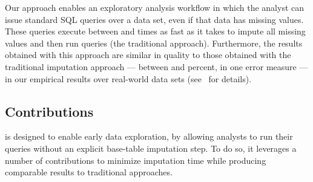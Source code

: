 

Our approach enables an exploratory analysis workflow in which the analyst can issue
standard SQL queries over a data set, even if that data has missing values.
These queries execute between \lowxalphazero{} and \highxalphazero{} times as fast as it takes to impute all missing values and then run queries (the traditional approach). Furthermore, the results obtained with this approach
are similar in quality to those obtained with the traditional imputation approach
--- between \lowsmapealphazero{} and \highsmapealphaone{}
percent, in one error measure --- in our empirical results over real-world data sets (see~
for details).


\subsection{Contributions}
\ProjectName{} is designed to enable early data exploration, by allowing analysts to run
their queries without an explicit base-table imputation step. To do so, it leverages a number of contributions
to minimize imputation time while producing comparable results to traditional approaches.

